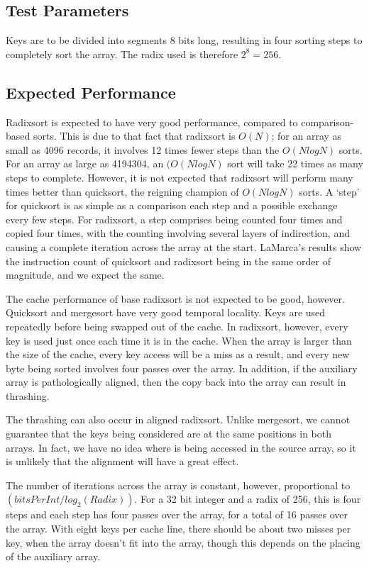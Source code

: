 \subsection{Test Parameters}
Keys are to be divided into segments 8 bits long, resulting in four sorting
steps to completely sort the array. The radix used is therefore $2^8 = 256$.

\subsection{Expected Performance}
Radixsort is expected to have very good performance, compared to
comparison-based sorts. This is due to that fact that radixsort is $O(N)$; for
an array as small as 4096 records, it involves 12 times fewer steps than the
$O(NlogN)$ sorts. For an array as large as 4194304, an $(O(NlogN)$ sort will
take 22 times as many steps to complete. However, it is not expected that
radixsort will perform many times better than quicksort, the reigning champion
of $O(NlogN)$ sorts. A `step' for quicksort is as simple as a comparison each
step and a possible exchange every few steps.  For radixsort, a step comprises
being counted four times and copied four times, with the counting involving
several layers of indirection, and causing a complete iteration across the array
at the start. LaMarca's results show the instruction count of quicksort and
radixsort being in the same order of magnitude, and we expect the same.

The cache performance of base radixsort is not expected to be good, however.
Quicksort and mergesort have very good temporal locality. Keys are
used repeatedly before being swapped out of the cache. In radixsort, however,
every key is used just once each time it is in the cache. When the array is larger than
the size of the cache, every key access will be a miss as a result, and every
new byte being sorted involves four passes over the array. In addition, if the
auxiliary array is pathologically aligned, then the copy back into the array
can result in thrashing.

The thrashing can also occur in aligned radixsort. Unlike mergesort, we cannot
guarantee that the keys being considered are at the same positions in both
arrays. In fact, we have no idea where is being accessed in the source array, so
it is unlikely that the alignment will have a great effect.

The number of iterations across the array is constant, however, proportional to
$(bitsPerInt/log_2(Radix))$. For a 32 bit integer and a radix of 256, this is
four steps and each step has four passes over the array, for a total of 16
passes over the array.  With eight keys per cache line, there should be about
two misses per key, when the array doesn't fit into the array, though this
depends on the placing of the auxiliary array.

